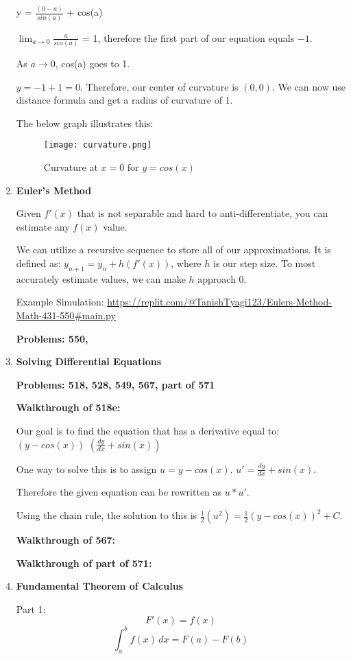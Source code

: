 \documentclass[11pt,twoside]{article}
\begin{document}
\begin{enumerate}
y = \(\frac{(0-a)}{sin(a)}\) + cos(a)

\(\lim_{a\to0} \frac{a}{sin(a)}\) = 1, therefore the first part of our equation equals $-1$. 

As $a \rightarrow\text{0}$, cos(a) goes to 1. 

$y = -1 + 1 = 0.$ Therefore, our center of curvature is $(0,0).$ We can now use distance formula and get a radius of curvature of 1. 

The below graph illustrates this:

\begin{figure}[H]
\centering
\texttt{[image: curvature.png]}
\caption{Curvature at $x = 0$ for $y = cos(x)$ }
\end{figure}


\item \textbf{Euler's Method}

Given $f'(x)$ that is not separable and hard to anti-differentiate, you can estimate any $f(x)$ value. 

We can utilize a recursive sequence to store all of our approximations. It is defined as: $y_{n+1} = y_{n} + h(f'(x))$, where $h$ is our step size. To most accurately estimate values, we can make $h$ approach 0.

Example Simulation: \url{https://replit.com/@TanishTyagi123/Eulers-Method-Math-431-550#main.py}

\textbf{Problems: 550,} 

\item \textbf{Solving Differential Equations}

\textbf{Problems: 518, 528, 549, 567, part of 571}

\textbf{Walkthrough of 518e:}

Our goal is to find the equation that has a derivative equal to: $(y-cos(x))$ $(\frac{dy}{dx} + sin(x))$

One way to solve this is to assign $u = y-cos(x)$. $u' = \frac{dy}{dx} + sin(x)$. 

Therefore the given equation can be rewritten as $u * u'$.

Using the chain rule, the solution to this is $\frac{1}{2}(u^2) = \frac{1}{2}(y-cos(x))^2 + C.$

\textbf{Walkthrough of 567:} 

\textbf{Walkthrough of part of 571:}


\item \textbf{Fundamental Theorem of Calculus} 

Part 1: 
$$ F'(x) = f(x) $$
$$ \int_{a}^{b} f(x) \,dx = F(a) - F(b) $$


\end{enumerate}
\end{document}
